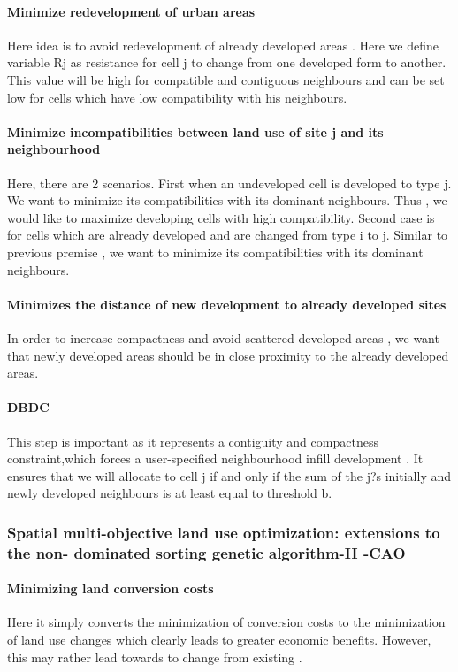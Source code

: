 \documentclass[12pt]{article} %
\begin{document}
\paragraph*{Minimize redevelopment of urban areas}  Here idea is to avoid redevelopment of already developed areas . Here we define variable Rj as resistance for cell j to change from one developed form to another. This value will be high for compatible and contiguous neighbours and can be set low for cells which have low compatibility with his neighbours.
\paragraph*{Minimize incompatibilities between land use of site j and its neighbourhood } Here, there are 2 scenarios. First when an undeveloped cell is developed to type j. We want to minimize its compatibilities with its dominant neighbours. Thus , we would like to maximize developing cells with high compatibility. Second case is for  cells which are already developed and are changed from type i to j. Similar to previous premise , we want  to minimize its compatibilities with its dominant neighbours. 
\paragraph*{Minimizes the distance of new development to already developed sites } In order to increase compactness and avoid scattered developed areas , we want that newly developed areas should be in close proximity to the already developed areas.
\paragraph*{DBDC}
This step is important as it represents a contiguity and compactness constraint,which forces a user-specified neighbourhood infill development . It ensures that we will allocate to cell j if and only if the sum of the j?s initially and newly developed neighbours is at least equal to threshold b.\\[.25cm]


\subsubsection{Spatial multi-objective land use optimization: extensions to the  non- dominated sorting genetic algorithm-II -CAO}
\paragraph*{Minimizing land conversion costs}
Here it simply converts the minimization of conversion costs to the minimization of land use changes which clearly leads to greater economic benefits. However, this may rather lead towards to change from existing .
\end{document}
